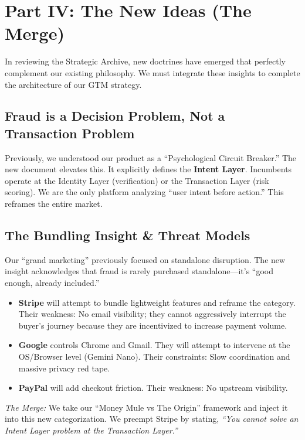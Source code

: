 \documentclass[11pt, letterpaper]{article}
\begin{document}
\section*{Part IV: The New Ideas (The Merge)}

In reviewing the Strategic Archive, new doctrines have emerged that perfectly complement our existing philosophy. We must integrate these insights to complete the architecture of our GTM strategy.

\subsection*{Fraud is a Decision Problem, Not a Transaction Problem}
Previously, we understood our product as a ``Psychological Circuit Breaker.'' The new document elevates this. It explicitly defines the \textbf{Intent Layer}. Incumbents operate at the Identity Layer (verification) or the Transaction Layer (risk scoring). We are the only platform analyzing ``user intent before action.'' This reframes the entire market. 

\subsection*{The Bundling Insight \& Threat Models}
Our ``grand marketing'' previously focused on standalone disruption. The new insight acknowledges that fraud is rarely purchased standalone---it's ``good enough, already included.'' 
\begin{itemize}
    \item \textbf{Stripe} will attempt to bundle lightweight features and reframe the category. Their weakness: No email visibility; they cannot aggressively interrupt the buyer's journey because they are incentivized to increase payment volume.
    \item \textbf{Google} controls Chrome and Gmail. They will attempt to intervene at the OS/Browser level (Gemini Nano). Their constraints: Slow coordination and massive privacy red tape.
    \item \textbf{PayPal} will add checkout friction. Their weakness: No upstream visibility.
\end{itemize}
\textit{The Merge:} We take our ``Money Mule vs The Origin'' framework and inject it into this new categorization. We preempt Stripe by stating, \textit{``You cannot solve an Intent Layer problem at the Transaction Layer.''} 
\end{document}
